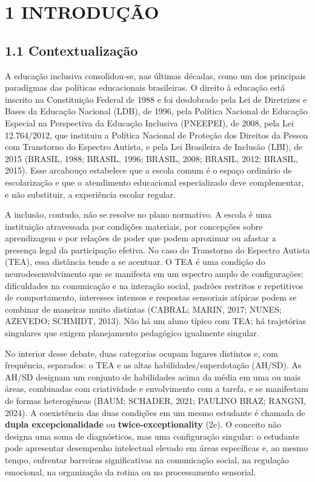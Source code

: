 \section{1 INTRODUÇÃO}\label{introduuxe7uxe3o}

\subsection{1.1 Contextualização}\label{contextualizauxe7uxe3o}

A educação inclusiva consolidou-se, nas últimas décadas, como um dos
principais paradigmas das políticas educacionais brasileiras. O direito
à educação está inscrito na Constituição Federal de 1988 e foi
desdobrado pela Lei de Diretrizes e Bases da Educação Nacional (LDB), de
1996, pela Política Nacional de Educação Especial na Perspectiva da
Educação Inclusiva (PNEEPEI), de 2008, pela Lei 12.764/2012, que
instituiu a Política Nacional de Proteção dos Direitos da Pessoa com
Transtorno do Espectro Autista, e pela Lei Brasileira de Inclusão (LBI),
de 2015 (BRASIL, 1988; BRASIL, 1996; BRASIL, 2008; BRASIL, 2012; BRASIL,
2015). Esse arcabouço estabelece que a escola comum é o espaço ordinário
de escolarização e que o atendimento educacional especializado deve
complementar, e não substituir, a experiência escolar regular.

A inclusão, contudo, não se resolve no plano normativo. A escola é uma
instituição atravessada por condições materiais, por concepções sobre
aprendizagem e por relações de poder que podem aproximar ou afastar a
presença legal da participação efetiva. No caso do Transtorno do
Espectro Autista (TEA), essa distância tende a se acentuar. O TEA é uma
condição do neurodesenvolvimento que se manifesta em um espectro amplo
de configurações: dificuldades na comunicação e na interação social,
padrões restritos e repetitivos de comportamento, interesses intensos e
respostas sensoriais atípicas podem se combinar de maneiras muito
distintas (CABRAL; MARIN, 2017; NUNES; AZEVEDO; SCHMIDT, 2013). Não há
um aluno típico com TEA; há trajetórias singulares que exigem
planejamento pedagógico igualmente singular.

No interior desse debate, duas categorias ocupam lugares distintos e,
com frequência, separados: o TEA e as altas habilidades/superdotação
(AH/SD). As AH/SD designam um conjunto de habilidades acima da média em
uma ou mais áreas, combinadas com criatividade e envolvimento com a
tarefa, e se manifestam de formas heterogêneas (BAUM; SCHADER, 2021;
PAULINO BRAZ; RANGNI, 2024). A coexistência das duas condições em um
mesmo estudante é chamada de \textbf{dupla excepcionalidade} ou
\textbf{twice-exceptionality} (2e). O conceito não designa uma soma de
diagnósticos, mas uma configuração singular: o estudante pode apresentar
desempenho intelectual elevado em áreas específicas e, ao mesmo tempo,
enfrentar barreiras significativas na comunicação social, na regulação
emocional, na organização da rotina ou no processamento sensorial.

